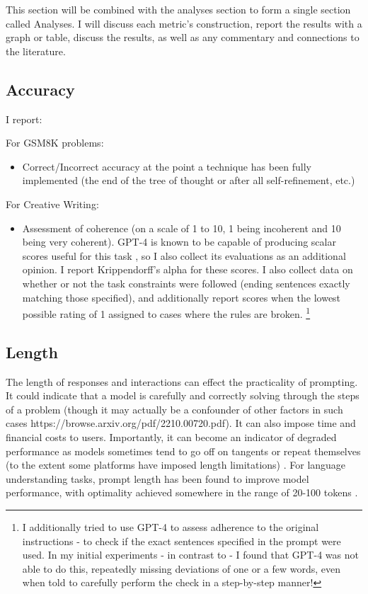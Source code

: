 \documentclass[11pt]{article}
\begin{document}
This section will be combined with the analyses section to form a single section called Analyses. I will discuss each metric's construction, report the results with a graph or table, discuss the results, as well as any commentary and connections to the literature.

\subsection*{Accuracy}

I report:

For GSM8K problems:
\begin{itemize}
  \item Correct/Incorrect accuracy at the point a technique has been fully implemented (the end of the tree of thought or after all self-refinement, etc.)
\end{itemize}

For Creative Writing:
\begin{itemize}
  \item Assessment of coherence (on a scale of 1 to 10, 1 being incoherent and 10 being very coherent). GPT-4 is known to be capable of producing scalar scores useful for this task \cite{yao_tree_2023}, so I also collect its evaluations as an additional opinion. I report Krippendorff's alpha for these scores. I also collect data on whether or not the task constraints were followed (ending sentences exactly matching those specified), and additionally report scores when the lowest possible rating of 1 assigned to cases where the rules are broken. \footnote{I additionally tried to use GPT-4 to assess adherence to the original instructions - to check if the exact sentences specified in the prompt were used. In my initial experiments - in contrast to \citealp{yao_tree_2023} - I found that GPT-4 was not able to do this, repeatedly missing deviations of one or a few words, even when told to carefully perform the check in a step-by-step manner!}
\end{itemize}

\subsection*{Length}

The length of responses and interactions can effect the practicality of prompting. It could indicate that a model is carefully and correctly solving through the steps of a problem (though it may actually be a confounder of other factors in such cases https://browse.arxiv.org/pdf/2210.00720.pdf). It can also impose time and financial costs to users. Importantly, it can become an indicator of degraded performance as models sometimes tend to go off on tangents or repeat themselves (to the extent some platforms have imposed length limitations) \cite{mann_microsoft_nodate}. For language understanding tasks, prompt length has been found to improve model performance, with optimality achieved somewhere in the range of 20-100 tokens \cite{lester_power_2021}.
\end{document}
